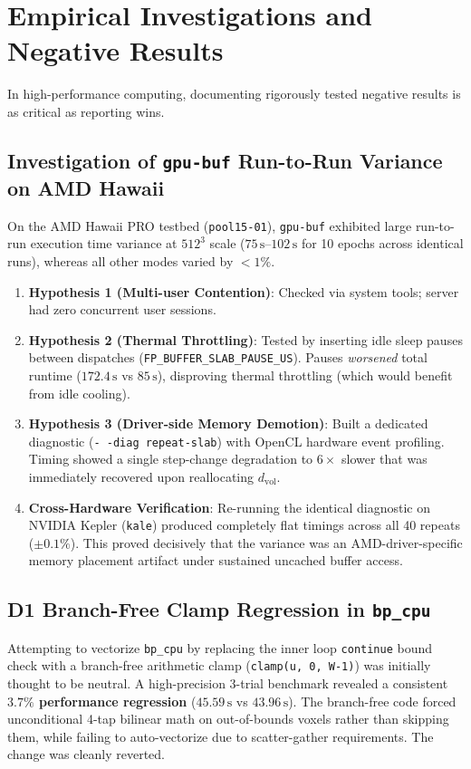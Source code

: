 \documentclass[11pt,a4paper]{article}
\begin{document}
\section{Empirical Investigations and Negative Results}
\label{sec:investigations}

In high-performance computing, documenting rigorously tested negative results is as critical as reporting wins.

\subsection{Investigation of \texttt{gpu-buf} Run-to-Run Variance on AMD Hawaii}
On the AMD Hawaii PRO testbed (\texttt{pool15-01}), \texttt{gpu-buf} exhibited large run-to-run execution time variance at $512^3$ scale ($75\,\text{s}\text{--}102\,\text{s}$ for 10 epochs across identical runs), whereas all other modes varied by $<1\%$.

\begin{enumerate}[noitemsep]
    \item \textbf{Hypothesis 1 (Multi-user Contention)}: Checked via system tools; server had zero concurrent user sessions.
    \item \textbf{Hypothesis 2 (Thermal Throttling)}: Tested by inserting idle sleep pauses between dispatches (\texttt{FP\_BUFFER\_SLAB\_PAUSE\_US}). Pauses \emph{worsened} total runtime ($172.4\,\text{s}$ vs $85\,\text{s}$), disproving thermal throttling (which would benefit from idle cooling).
    \item \textbf{Hypothesis 3 (Driver-side Memory Demotion)}: Built a dedicated diagnostic (\texttt{-\,-diag repeat-slab}) with OpenCL hardware event profiling. Timing showed a single step-change degradation to $6\times$ slower that was immediately recovered upon reallocating $d_{\text{vol}}$.
    \item \textbf{Cross-Hardware Verification}: Re-running the identical diagnostic on NVIDIA Kepler (\texttt{kale}) produced completely flat timings across all 40 repeats ($\pm 0.1\%$). This proved decisively that the variance was an AMD-driver-specific memory placement artifact under sustained uncached buffer access.
\end{enumerate}

\subsection{D1 Branch-Free Clamp Regression in \texttt{bp\_cpu}}
Attempting to vectorize \texttt{bp\_cpu} by replacing the inner loop \texttt{continue} bound check with a branch-free arithmetic clamp (\texttt{clamp(u, 0, W-1)}) was initially thought to be neutral. A high-precision 3-trial benchmark revealed a consistent \textbf{$3.7\%$ performance regression} ($45.59\,\text{s}$ vs $43.96\,\text{s}$). The branch-free code forced unconditional 4-tap bilinear math on out-of-bounds voxels rather than skipping them, while failing to auto-vectorize due to scatter-gather requirements. The change was cleanly reverted.
\end{document}
